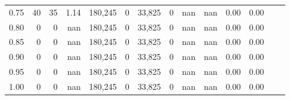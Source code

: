 \begin{tabular}{rrrrrrrrrrrrrr}
0.75 &      40 &     35 &    1.14 &  180,245 &        0 &  33,825 &       0 &   nan &   nan &  0.00 &      0.00 \\
0.80 &       0 &      0 &     nan &  180,245 &        0 &  33,825 &       0 &   nan &   nan &  0.00 &      0.00 \\
0.85 &       0 &      0 &     nan &  180,245 &        0 &  33,825 &       0 &   nan &   nan &  0.00 &      0.00 \\
0.90 &       0 &      0 &     nan &  180,245 &        0 &  33,825 &       0 &   nan &   nan &  0.00 &      0.00 \\
0.95 &       0 &      0 &     nan &  180,245 &        0 &  33,825 &       0 &   nan &   nan &  0.00 &      0.00 \\
1.00 &       0 &      0 &     nan &  180,245 &        0 &  33,825 &       0 &   nan &   nan &  0.00 &      0.00 \\
\bottomrule
\end{tabular}
